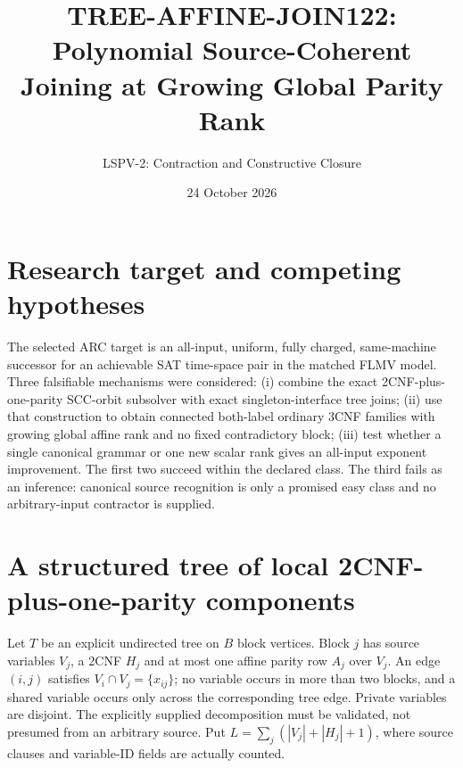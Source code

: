 \documentclass[11pt]{article}
\title{TREE-AFFINE-JOIN122: Polynomial Source-Coherent Joining at Growing Global Parity Rank}
\author{LSPV-2: Contraction and Constructive Closure}
\date{24 October 2026}
\begin{document}
\maketitle
\begin{center}\end{center}
\section{Research target and competing hypotheses}
The selected ARC target is an all-input, uniform, fully charged, same-machine successor for an achievable SAT time-space pair in the matched FLMV model. Three falsifiable mechanisms were considered: (i) combine the exact 2CNF-plus-one-parity SCC-orbit subsolver with exact singleton-interface tree joins; (ii) use that construction to obtain connected both-label ordinary 3CNF families with growing global affine rank and no fixed contradictory block; (iii) test whether a single canonical grammar or one new scalar rank gives an all-input exponent improvement. The first two succeed within the declared class. The third fails as an inference: canonical source recognition is only a promised easy class and no arbitrary-input contractor is supplied.

\section{A structured tree of local 2CNF-plus-one-parity components}
Let $T$ be an explicit undirected tree on $B$ block vertices. Block $j$ has source variables $V_j$, a 2CNF $H_j$ and at most one affine parity row $A_j$ over $V_j$. An edge $(i,j)$ satisfies $V_i\cap V_j=\{x_{ij}\}$; no variable occurs in more than two blocks, and a shared variable occurs only across the corresponding tree edge. Private variables are disjoint. The explicitly supplied decomposition must be validated, not presumed from an arbitrary source. Put $L=\sum_j(|V_j|+|H_j|+1)$, where source clauses and variable-ID fields are actually counted.
\end{document}
